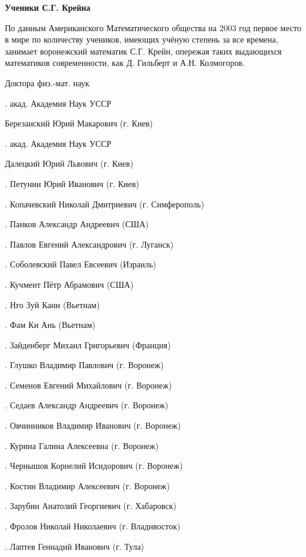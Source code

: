 \begin{center}
{\bf Ученики С.Г. Крейна}
\end{center}

По данным Американского Математического общества на 2003 год первое место в мире по количеству учеников, имеющих учёную степень за все времена, занимает воронежский математик С.Г. Крейн, опережая таких выдающихся математиков современности, как Д. Гильберт и А.Н. Колмогоров.

Доктора физ.-мат. наук

.	акад. Академия Наук УССР \par Березанский Юрий Макарович (г. Киев)

.	акад. Академия Наук УССР \par Далецкий Юрий Львович (г. Киев)

.	Петунин Юрий Иванович (г. Киев)

.	Копачевский Николай Дмитриевич (г. Симферополь)

.	Панков Александр Андреевич (США)

.	Павлов Евгений Александрович (г. Луганск)

.	Соболевский Павел Евсеевич (Израиль)

.	Кучмент Пётр Абрамович (США)

.	Нго Зуй Канн (Вьетнам)

.	 Фам Ки Ань (Вьетнам)

.	 Зайденберг Михаил Григорьевич (Франция)

.	 Глушко Владимир Павлович (г. Воронеж)

.	 Семенов Евгений Михайлович (г. Воронеж)

.	 Седаев Александр Андреевич (г. Воронеж)

.	 Овчинников Владимир Иванович (г. Воронеж)

.	 Курина Галина Алексеевна (г. Воронеж)

.	 Чернышов Корнелий Исидорович (г. Воронеж)

.	 Костин Владимир Алексеевич (г. Воронеж)

.	 Зарубин Анатолий Георгиевич (г. Хабаровск)

.	 Фролов Николай Николаевич (г. Владивосток)

.	 Лаптев Геннадий Иванович (г. Тула)

